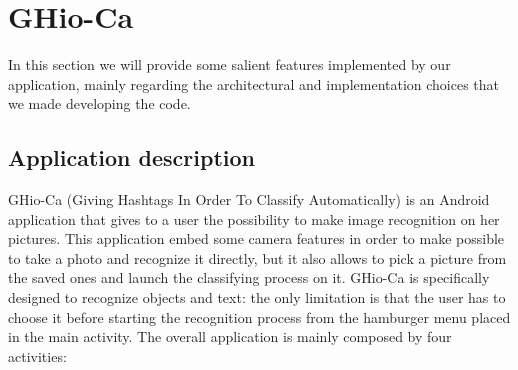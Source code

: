 \section{GHio-Ca}
In this section we will provide some salient features implemented by our 
application, mainly regarding the architectural and implementation choices that 
we made developing the code.

\subsection{Application description}
GHio-Ca (Giving Hashtags In Order To Classify Automatically) is an Android
application that gives to a user the possibility to make image recognition on
her pictures. This application embed some camera features in order to make
possible to take a photo and recognize it directly, but it also allows to pick
a picture from the saved ones and launch the classifying process on it.
GHio-Ca is specifically designed to recognize objects and text: the only
limitation is that the user has to choose it before starting the
recognition process from the hamburger menu placed in the main activity.
The overall application is mainly composed by four activities:
